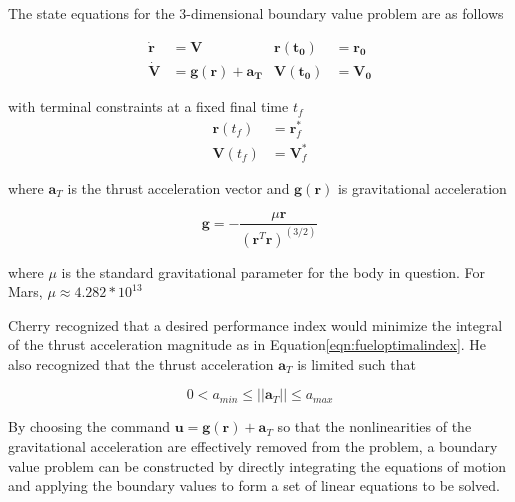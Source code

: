 The state equations for the 3-dimensional boundary value problem are as follows

\begin{align}
\label{eqn:EoM1}
\bm{\dot{r}} &= \bm{V}                               & \bm{r(t_0)} &= \bm{r_0}\\
\label{eqn:EoM2}
\bm{\dot{V}} &= \bm{g(r)} + \bm{a_T}                           & \bm{V(t_0)} &= \bm{V_0}
\end{align}


with terminal constraints at a fixed final time $t_f$
\begin{align}
\label{eqn:constraint_r}
\bm{r}(t_f) &= \bm{r}^*_f\\
\label{eqn:constraint_V}
\bm{V}(t_f) &= \bm{V}^*_f 
\end{align}

where $\bm{a}_T$ is the thrust acceleration vector and $\bm{g}(\bm{r})$ is gravitational acceleration

\begin{equation}
\label{eqn:gravity}
\bm{g} = -\frac{\mu \bm{r}}{(\bm{r}^T\bm{r})^{(3/2)}}
\end{equation}

where $\mu$ is the standard gravitational parameter for the body in question. For Mars, $\mu \approx 4.282*10^{13}$

Cherry recognized that a desired performance index would minimize the integral of the thrust acceleration magnitude as in Equation\:\ref{eqn:fueloptimalindex}. He also recognized that the thrust acceleration $\bm{a}_T$ is limited such that

\begin{equation} 
\label{eqn:thrustlimit}
0 < a_{min} \leq ||\bm{a}_T|| \leq a_{max}
\end{equation}

By choosing the command $\bm{u} = \bm{g(r)} + \bm{a}_T$ so that the nonlinearities of the gravitational acceleration are effectively removed from the problem, a boundary value problem can be constructed by directly integrating the equations of motion and applying the boundary values to form a set of linear equations to be solved.

